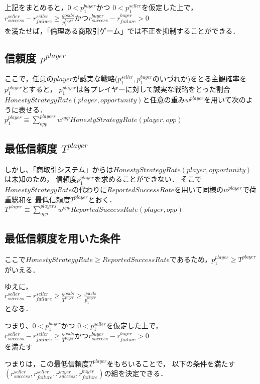 上記をまとめると，$ 0<p^{buyer}_1 $かつ $ 0 < p^{seller}_{1} $を仮定した上で，\\

$ r^{seller}_{success} - r^{seller}_{failure} \geq \frac{goods}{p^{buyer}_1} $かつ$ r^{buyer}_{success} - r^{buyer}_{failure} > 0 $ \\

を満たせば，「倫理ある商取引ゲーム」では不正を抑制することができる．


\subsection{信頼度 $ p^{player} $}

ここで，任意の$ player $が誠実な戦略($ p^{seller}_1, p^{buyer}_1 $のいづれか)をとる主観確率を$ p^{player}_1 $とすると，
$ p^{player}_1 $は各プレイヤーに対して誠実な戦略をとった割合$ HonestyStrategyRate(player, opportunity) $と任意の重み$ w^{player} $を用いて次のように表せる． \\

$ p^{player}_1 \equiv \sum^{players}_{opp} w^{opp} HonestyStrategyRate(player, opp) $


\subsection{最低信頼度 $ T^{player} $}

しかし、「商取引システム」からは$ HonestyStrategyRate(player, opportunity) $は未知のため，
信頼度$ p^{player}_1 $を求めることができない．
そこで$ HonestyStrategyRate $の代わりに$ ReportedSuccessRate $を用いて同様の$ w^{player} $で荷重総和を
最低信頼度$ T^{player} $とおく． \\

$ T^{player} \equiv \sum^{players}_{opp} {w}^{opp} ReportedSuccessRate(player, opp) $ \\

\subsection{最低信頼度を用いた条件}
ここで$ HonestyStrategyRate \geq ReportedSuccessRate $であるため，$ p^{player}_1 \geq T^{player} $がいえる．

ゆえに， \\

$ r^{seller}_{success} - r^{seller}_{failure}  \geq \frac{goods}{T^{buyer}} \geq \frac{goods}{p^{buyer}_1} $ \\

となる．

つまり、$ 0<p^{buyer}_1 $かつ $ 0 < p^{seller}_{1} $を仮定した上で，\\

$ r^{seller}_{success} - r^{seller}_{failure} \geq \frac{goods}{T^{buyer}} $かつ$ r^{buyer}_{success} - r^{buyer}_{failure} > 0 $ \\

を満たす



つまりは，この最低信頼度$ T^{player} $をもちいることで，
以下の条件を満たす$ (r^{seller}_{success}, r^{seller}_{failure}, r^{buyer}_{success}, r^{buyer}_{failure}) $の組を決定できる．
